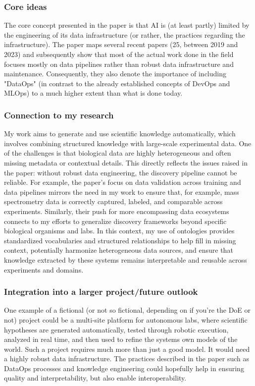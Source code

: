 \documentclass[11pt,compsoc,a4paper]{IEEEtran}
\begin{document}
    \subsubsection*{Core ideas}
    The core concept presented in the paper \cite{10.1145/3644815.3644954} is that AI is (at least partly) limited by the engineering of its data infrastructure (or rather, the practices regarding the infrastructure). The paper maps several recent papers (25, between 2019 and 2023) and subsequently show that most of the actual work done in the field focuses mostly on data pipelines rather than robust data infrastructure and maintenance. Consequently, they also denote the importance of including "DataOps" (in contrast to the already established concepts of DevOps and MLOps) to a much higher extent than what is done today. 

    \subsubsection*{Connection to my research}
    My work aims to generate and use scientific knowledge automatically, which involves combining structured knowledge with large-scale experimental data. One of the challenges is that biological data are highly heterogeneous and often missing metadata or contextual details. This directly reflects the issues raised in the paper: without robust data engineering, the discovery pipeline cannot be reliable. For example, the paper's focus on data validation across training and data pipelines mirrors the need in my work to ensure that, for example, mass spectrometry data is correctly captured, labeled, and comparable across experiments. Similarly, their push for more encompassing data ecosystems connects to my efforts to generalize discovery frameworks beyond specific biological organisms and labs. In this context, my use of ontologies provides standardized vocabularies and structured relationships to help fill in missing context, potentially harmonize heterogeneous data sources, and ensure that knowledge extracted by these systems remains interpretable and reusable across experiments and domains.

    \subsubsection*{Integration into a larger project/future outlook}
    One example of a fictional (or not so fictional, depending on if you're the DoE or not) project could be a multi-site platform for autonomous labs, where scientific hypotheses are generated automatically, tested through robotic execution, analyzed in real time, and then used to refine the systems own models of the world. Such a project requires much more than just a good model. It would need a highly robust data infrastructure. The practices described in the paper such as DataOps processes and knowledge engineering could hopefully help in ensuring quality and interpretability, but also enable interoperability. 
    
\end{document}
